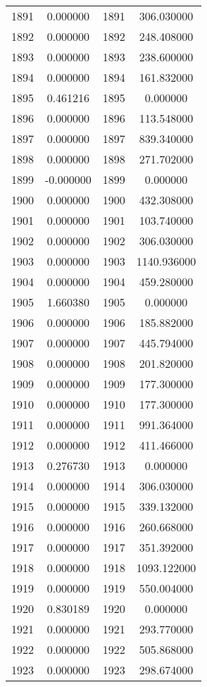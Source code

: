 \documentclass[12pt]{article}
\begin{document}
\begin{longtable}{@{}cccc@{}}
1891 & 0.000000 & 1891 & 306.030000 \\
1892 & 0.000000 & 1892 & 248.408000 \\
1893 & 0.000000 & 1893 & 238.600000 \\
1894 & 0.000000 & 1894 & 161.832000 \\
1895 & 0.461216 & 1895 & 0.000000 \\
1896 & 0.000000 & 1896 & 113.548000 \\
1897 & 0.000000 & 1897 & 839.340000 \\
1898 & 0.000000 & 1898 & 271.702000 \\
1899 & -0.000000 & 1899 & 0.000000 \\
1900 & 0.000000 & 1900 & 432.308000 \\
1901 & 0.000000 & 1901 & 103.740000 \\
1902 & 0.000000 & 1902 & 306.030000 \\
1903 & 0.000000 & 1903 & 1140.936000 \\
1904 & 0.000000 & 1904 & 459.280000 \\
1905 & 1.660380 & 1905 & 0.000000 \\
1906 & 0.000000 & 1906 & 185.882000 \\
1907 & 0.000000 & 1907 & 445.794000 \\
1908 & 0.000000 & 1908 & 201.820000 \\
1909 & 0.000000 & 1909 & 177.300000 \\
1910 & 0.000000 & 1910 & 177.300000 \\
1911 & 0.000000 & 1911 & 991.364000 \\
1912 & 0.000000 & 1912 & 411.466000 \\
1913 & 0.276730 & 1913 & 0.000000 \\
1914 & 0.000000 & 1914 & 306.030000 \\
1915 & 0.000000 & 1915 & 339.132000 \\
1916 & 0.000000 & 1916 & 260.668000 \\
1917 & 0.000000 & 1917 & 351.392000 \\
1918 & 0.000000 & 1918 & 1093.122000 \\
1919 & 0.000000 & 1919 & 550.004000 \\
1920 & 0.830189 & 1920 & 0.000000 \\
1921 & 0.000000 & 1921 & 293.770000 \\
1922 & 0.000000 & 1922 & 505.868000 \\
1923 & 0.000000 & 1923 & 298.674000 \\

\end{longtable}
\end{document}
